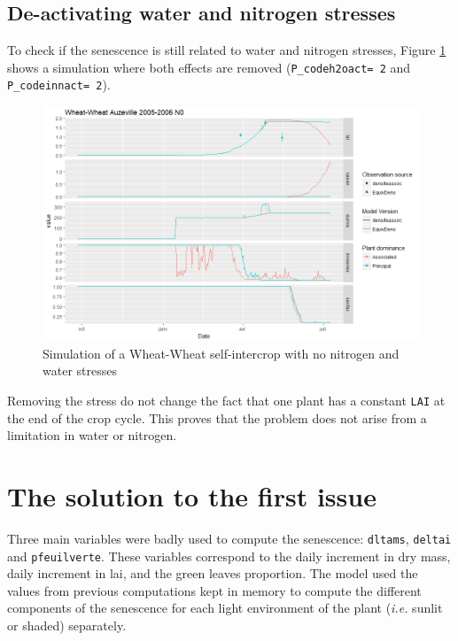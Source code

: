 \documentclass[]{book}
\begin{document}
\hypertarget{de-activating-water-and-nitrogen-stresses}{%
\subsection{De-activating water and nitrogen stresses}\label{de-activating-water-and-nitrogen-stresses}}

To check if the senescence is still related to water and nitrogen stresses, Figure \ref{fig:nostress} shows a simulation where both effects are removed (\texttt{P\_codeh2oact=\ 2} and \texttt{P\_codeinnact=\ 2}).

\begin{figure}
\centering
\includegraphics{img/nostress.png}
\caption{\label{fig:nostress}Simulation of a Wheat-Wheat self-intercrop with no nitrogen and water stresses}
\end{figure}

Removing the stress do not change the fact that one plant has a constant \texttt{LAI} at the end of the crop cycle. This proves that the problem does not arise from a limitation in water or nitrogen.

\hypertarget{the-solution-to-the-first-issue}{%
\section{The solution to the first issue}\label{the-solution-to-the-first-issue}}

Three main variables were badly used to compute the senescence: \texttt{dltams}, \texttt{deltai} and \texttt{pfeuilverte}. These variables correspond to the daily increment in dry mass, daily increment in lai, and the green leaves proportion. The model used the values from previous computations kept in memory to compute the different components of the senescence for each light environment of the plant (\emph{i.e.} sunlit or shaded) separately.
\end{document}
